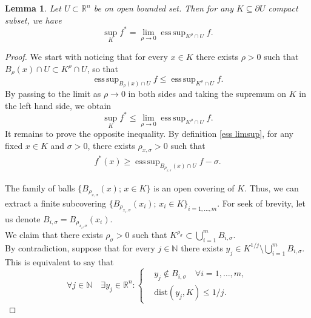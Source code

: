 \documentclass[a4paper,11pt]{article}
\numberwithin{equation}{section}
\newtheorem{Lemma}[Theorem]{Lemma}
\newcommand{\numberset}{\mathbb}
\newcommand{\N}{\numberset{N}}
\newcommand{\R}{\numberset{R}}
\DeclareMathOperator*{\esssup}{ess\,sup}
\theoremstyle{definition}
\begin{document}
\begin{Lemma}\label{lemma esssup}
Let $U\subset\R^n$ be on open bounded set. Then for any $K\subseteq\partial U$ compact subset, we have
$$
\sup_K f^*=\lim_{\rho\to0} \esssup_{K^\rho\cap U}f.
$$
\end{Lemma}
\begin{proof}
We start with noticing that for every $x\in K$ there exists $\rho>0$ such that $B_\rho(x)\cap U\subset K^\rho\cap U$, so that
$$
\esssup_{B_\rho(x)\cap U}f\leq \esssup_{K^\rho\cap U}f.
$$
By passing to the limit as $\rho\to0$ in both sides and taking the supremum on $K$ in the left hand side, we obtain
$$
\sup_K f^*\leq\lim_{\rho\to0} \esssup_{K^\rho\cap U}f.
$$
It remains to prove the opposite inequality. By definition \eqref{ess limsup}, for any fixed $x\in K$ and $\sigma>0$, there exists $\rho_{x,\sigma}>0$ such that 
\begin{align}\label{def of lim}
f^*(x)\geq\esssup_{B_{\rho_{x,\sigma}}(x)\cap U}f-\sigma.
\end{align}

The family of balls $\{B_{\rho_{x,\sigma}}(x); \,x\in K\}$ is an open covering of $K$. Thus, we can extract a finite subcovering $\{B_{\rho_{x_i,\sigma}}(x_i); \,x_i\in K\} _{i=1,\ldots,m}$.
For seek of brevity, let us denote $B_{i,\sigma}=B_{\rho_{x_i,\sigma}}(x_i)$.\\
We claim that there exists $\rho_\sigma>0$ such that $K^{\rho_\sigma}\subset \bigcup_{i=1}^m B_{i,\sigma}$.\\
By contradiction, suppose that for every $j\in\N$ there exists $y_j\in K^{1/j}\setminus\bigcup_{i=1}^m B_{i,\sigma}$. This is equivalent to say that 
\begin{equation}\label{contr}
\forall j\in\N\quad\exists y_j\in\R^n:\left\{
\begin{aligned}
 &y_j\notin B_{i,\sigma}\quad\forall i=1,\ldots,m,\\
&\mathrm{dist}(y_j,K)\leq 1/j.
\end{aligned}
\right.
\end{equation}

\end{proof}
\end{document}
